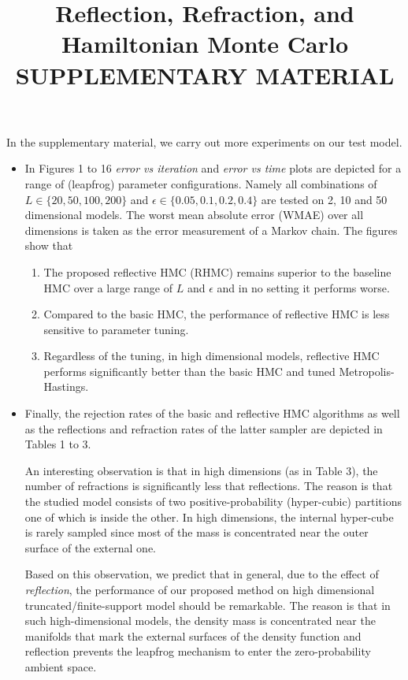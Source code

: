 \documentclass{article} %
\title{Reflection, Refraction, and Hamiltonian Monte Carlo\\\vspace{8pt}SUPPLEMENTARY MATERIAL}
\begin{document}
\maketitle

In the supplementary material, we carry out more experiments on our test model.
\begin{itemize}
\item In Figures 1 to 16 \emph{error vs iteration} and \emph{error vs time} plots are depicted for a range of (leapfrog) parameter configurations. Namely all combinations of $L \in \{20, 50, 100, 200\}$ and $\epsilon \in \{0.05, 0.1, 0.2, 0.4\}$ are tested on 2, 10 and 50 dimensional models. 
The worst mean absolute error (WMAE) over all dimensions is taken as the error measurement of a Markov chain. 
The figures show that 
\begin{enumerate}
\item 
The proposed reflective HMC (RHMC) remains superior to the baseline HMC over a large range of $L$ and $\epsilon$ and in no setting it performs worse.
\item Compared to the basic HMC, the performance of reflective HMC is less sensitive to parameter tuning.
\item Regardless of the tuning, in high dimensional models, reflective HMC performs significantly better than the basic HMC and tuned Metropolis-Hastings.
 \end{enumerate}
\item Finally, the rejection rates of the basic and reflective HMC algorithms as well as the reflections and refraction rates of the latter sampler are depicted in Tables 1 to 3. 

An interesting observation is that in high dimensions (as in Table 3), the number of refractions is significantly less that reflections. 
The reason is that the studied model consists of  two positive-probability (hyper-cubic) partitions one of which is inside the other. In high dimensions, the internal hyper-cube is rarely sampled since most of the mass is concentrated near the outer surface of the external one. 

Based on this observation, we predict that in general, due to the effect of \emph{reflection}, the performance of our proposed method on high dimensional truncated/finite-support model should be remarkable.
The reason is that in such high-dimensional models, the density mass is concentrated near the manifolds that mark the external surfaces of the density function and reflection prevents the leapfrog mechanism to enter the zero-probability ambient space. 
\end{itemize}
\end{document}
